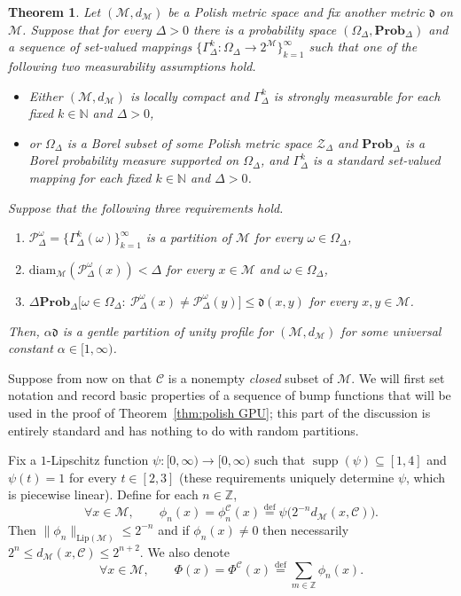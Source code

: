\documentclass[11pt,reqno]{amsart}
\renewcommand{\le}{\leqslant}
\newcommand{\diam}{\mathrm{diam}}
\newtheorem{theorem}{Theorem}
\theoremstyle{remark}
\newcommand{\MM}{\mathcal{M}}
\renewcommand{\subset}{\subseteq}
\DeclareMathOperator{\supp}{supp}
\newcommand{\N}{\mathbb N}
\newcommand{\Z}{\mathbb Z}
\newcommand{\eqdef}{\stackrel{\mathrm{def}}{=}}
\newcommand{\Lip}{\mathrm{Lip}}
\renewcommand{\Pr}{\mathbf{Prob}}
\newcommand{\sub}{\mathscr{C}}
\renewcommand{\1}{\mathbf 1}
\newcommand{\Part}{\mathscr{P}}
\newcommand{\ZZ}{\mathcal{Z}}
\begin{document}
\begin{theorem}\label{thm:polish GPU} Let $(\MM,d_\MM)$ be a Polish metric space and fix another metric $\mathfrak{d}$ on $\MM$. Suppose that for every $\Delta>0$ there is a probability space $(\Omega_\Delta, \Pr_\Delta)$ and a sequence of set-valued mappings $\{\Gamma^k_\Delta:\Omega_\Delta\to 2^\MM\}_{k=1}^\infty$ such that one of the following two measurability assumptions hold.
\begin{itemize}
\item Either $(\MM,d_\MM)$  is locally compact and  $\Gamma^k_\Delta$ is strongly measurable for each fixed $k \in \N$ and $\Delta>0$,
\item or  $\Omega_\Delta$ is a Borel subset of some Polish metric space $\ZZ_\Delta$  and $\Pr_\Delta$ is a Borel probability measure supported on $\Omega_\Delta$,  and $\Gamma^k_\Delta$ is a standard set-valued mapping for each fixed $k \in \N$ and $\Delta>0$.
\end{itemize}
Suppose that the following three requirements hold.
\begin{enumerate}
\item $\Part_\Delta^\omega=\{\Gamma^k_\Delta(\omega)\}_{k=1}^\infty$ is a partition of $\MM$ for every $\omega \in \Omega_\Delta$,
\item $\diam_\MM(\Part_\Delta^\omega(x))< \Delta$ for every $x\in \MM$ and $\omega\in \Omega_\Delta$,
\item $\Delta \Pr_\Delta\big[\omega\in \Omega_\Delta:\ \Part_\Delta^\omega(x)\neq\Part_\Delta^\omega(y)\big]\le \mathfrak{d}(x,y)$ for every $x,y\in \MM$.
\end{enumerate}
Then, $\alpha\mathfrak{d}$ is a gentle partition of unity profile  for $(\MM,d_\MM)$ for some  universal constant $\alpha\in [1,\infty)$.
\end{theorem}





Suppose from now on that $\sub$ is a nonempty {\em closed} subset of $\MM$. We will first  set notation and record basic properties of  a sequence of bump functions that will be used in the proof of Theorem~\eqref{thm:polish GPU}; this part of the discussion is entirely standard and has nothing to do with random partitions.


Fix a $1$-Lipschitz function $\psi:[0,\infty)\to [0,\infty)$ such that $\supp(\psi)\subset [1,4]$ and $\psi(t)=1$ for every $t\in [2,3]$ (these requirements uniquely determine $\psi$, which is piecewise linear). Define for each $n\in \Z$,
$$
\forall x\in \MM,\qquad \phi_n(x)=\phi_n^\sub(x)\eqdef \psi\big(2^{-n}d_{\MM}(x,\sub)\big).
$$
Then $\|\phi_n\|_{\Lip(\MM)}\le 2^{-n}$ and if $\phi_n(x)\neq 0$ then necessarily $2^n\le d_{\MM}(x,\sub)\le 2^{n+2}$. We  also denote
$$
\forall x\in \MM,\qquad \Phi(x)=\Phi^\sub(x)\eqdef \sum_{m\in \Z} \phi_n(x).
$$
\end{document}
